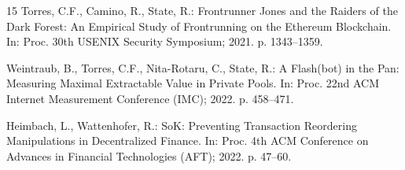 \documentclass{llncs}
\begin{document}
\begin{thebibliography}{15}
Torres, C.F., Camino, R., State, R.: Frontrunner Jones and the Raiders
of the Dark Forest: An Empirical Study of Frontrunning on the Ethereum
Blockchain. In: Proc. 30th USENIX Security Symposium; 2021. p.
1343--1359.

Weintraub, B., Torres, C.F., Nita-Rotaru, C., State, R.: A Flash(bot) in
the Pan: Measuring Maximal Extractable Value in Private Pools. In: Proc.
22nd ACM Internet Measurement Conference (IMC); 2022. p. 458--471.

Heimbach, L., Wattenhofer, R.: SoK: Preventing Transaction Reordering
Manipulations in Decentralized Finance. In: Proc. 4th ACM Conference on
Advances in Financial Technologies (AFT); 2022. p. 47--60.

\end{thebibliography}
\end{document}
